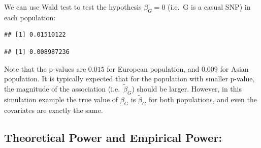 \documentclass[
]{article}
\newenvironment{Shaded}{\begin{snugshade}}{\end{snugshade}}
\newcommand{\CommentTok}[1]{\textcolor[rgb]{0.56,0.35,0.01}{\textit{#1}}}
\newcommand{\DataTypeTok}[1]{\textcolor[rgb]{0.13,0.29,0.53}{#1}}
\newcommand{\DecValTok}[1]{\textcolor[rgb]{0.00,0.00,0.81}{#1}}
\newcommand{\KeywordTok}[1]{\textcolor[rgb]{0.13,0.29,0.53}{\textbf{#1}}}
\newcommand{\NormalTok}[1]{#1}
\newcommand{\OperatorTok}[1]{\textcolor[rgb]{0.81,0.36,0.00}{\textbf{#1}}}
\newcommand{\StringTok}[1]{\textcolor[rgb]{0.31,0.60,0.02}{#1}}
\begin{document}
We can use Wald test to test the hypothesis \(\beta_G = 0\) (i.e.~G is a
casual SNP) in each population:

\begin{Shaded}
\end{Shaded}

\begin{verbatim}
## [1] 0.01510122
\end{verbatim}

\begin{Shaded}
\end{Shaded}

\begin{verbatim}
## [1] 0.008987236
\end{verbatim}

Note that the p-values are \(0.015\) for European population, and
\(0.009\) for Asian population. It is typically expected that for the
population with smaller p-value, the magnitude of the association
(i.e.~\(\tilde{\beta}_G\)) should be larger. However, in this simulation
example the true value of \(\beta_G\) is \(\tilde{\beta}_G\) for both
populations, and even the covariates are exactly the same.

\hypertarget{theoretical-power-and-empirical-power}{%
\subsection{Theoretical Power and Empirical
Power:}\label{theoretical-power-and-empirical-power}}
\end{document}
